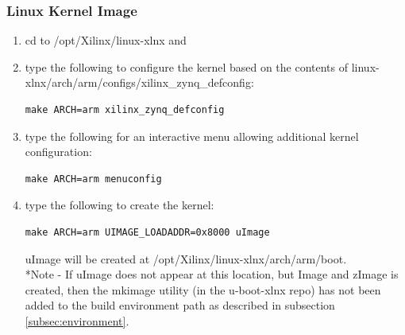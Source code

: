 \documentclass[12pt]{article}
\begin{document}
\subsubsection{Linux Kernel Image} \label{subsec:LinuxKernel}
\begin{enumerate}
\item cd to /opt/Xilinx/linux-xlnx and
\item type the following to configure the kernel based on the contents of linux-xlnx/arch/arm/configs/xilinx\_zynq\_defconfig:
\begin{lstlisting}
make ARCH=arm xilinx_zynq_defconfig
\end{lstlisting}
\item type the following for an interactive menu allowing additional kernel configuration:
\begin{lstlisting}
make ARCH=arm menuconfig
\end{lstlisting}
\item type the following to create the kernel: \label{itm:CreateKernel}
\begin{lstlisting}
make ARCH=arm UIMAGE_LOADADDR=0x8000 uImage
\end{lstlisting}
uImage will be created at /opt/Xilinx/linux-xlnx/arch/arm/boot.\\
*Note - If uImage does not appear at this location, but Image and zImage is created, then the mkimage utility (in the u-boot-xlnx repo) has not been added to the build environment path as described in subsection \ref{subsec:environment}.
\end{enumerate}
\end{document}
